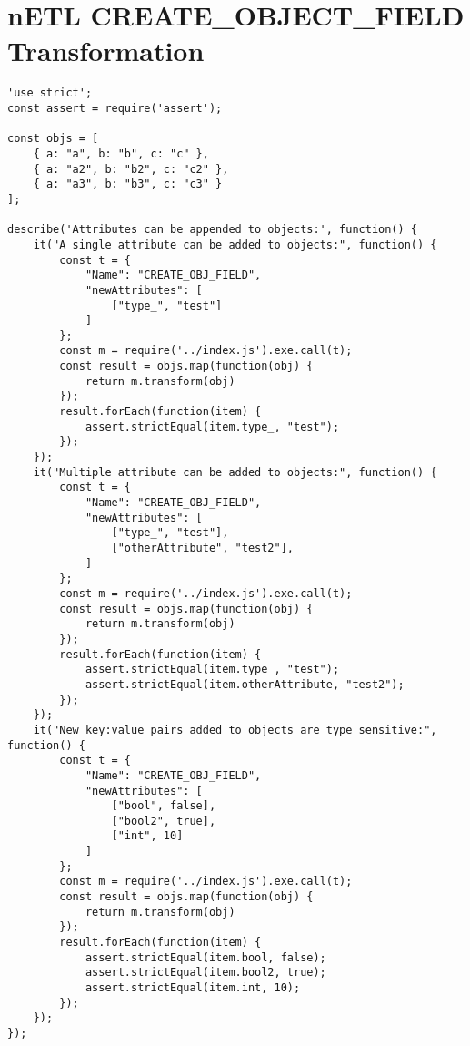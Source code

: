 \section{nETL CREATE\_OBJECT\_FIELD Transformation}
\label{CREATE_OBJECT_FIELD-tests}
\begin{verbatim}
'use strict';
const assert = require('assert');

const objs = [
    { a: "a", b: "b", c: "c" },
    { a: "a2", b: "b2", c: "c2" },
    { a: "a3", b: "b3", c: "c3" }
];

describe('Attributes can be appended to objects:', function() {
    it("A single attribute can be added to objects:", function() {
        const t = {
            "Name": "CREATE_OBJ_FIELD",
            "newAttributes": [
                ["type_", "test"]
            ]
        };
        const m = require('../index.js').exe.call(t);
        const result = objs.map(function(obj) {
            return m.transform(obj)
        });
        result.forEach(function(item) {
            assert.strictEqual(item.type_, "test");
        });
    });
    it("Multiple attribute can be added to objects:", function() {
        const t = {
            "Name": "CREATE_OBJ_FIELD",
            "newAttributes": [
                ["type_", "test"],
                ["otherAttribute", "test2"],
            ]
        };
        const m = require('../index.js').exe.call(t);
        const result = objs.map(function(obj) {
            return m.transform(obj)
        });
        result.forEach(function(item) {
            assert.strictEqual(item.type_, "test");
            assert.strictEqual(item.otherAttribute, "test2");
        });
    });
    it("New key:value pairs added to objects are type sensitive:", function() {
        const t = {
            "Name": "CREATE_OBJ_FIELD",
            "newAttributes": [
                ["bool", false],
                ["bool2", true],
                ["int", 10]
            ]
        };
        const m = require('../index.js').exe.call(t);
        const result = objs.map(function(obj) {
            return m.transform(obj)
        });
        result.forEach(function(item) {
            assert.strictEqual(item.bool, false);
            assert.strictEqual(item.bool2, true);
            assert.strictEqual(item.int, 10);
        });
    });
});
\end{verbatim}